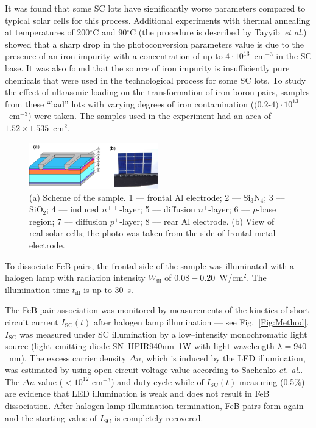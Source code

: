 \documentclass[%
 aip,jap,
 amsmath,amssymb,
 reprint,%
]{revtex4-1}
\begin{document}
It was found that some SC lots have significantly worse parameters compared to typical solar cells for this process.
Additional experiments with thermal annealing at temperatures of 200$^\circ$C and 90$^\circ$C
(the procedure is described by Tayyib~\emph{et al.}\cite{TAYYIB201221})
showed that a sharp drop in the photoconversion parameters value is due to the presence of an iron impurity with a concentration of up to $4\cdot10^{13}$~cm$^{-3}$ in the SC base.
It was also found that the source of iron impurity is insufficiently pure chemicals that were used in the technological process for some SC lots.
To study the effect of ultrasonic loading on the transformation  of iron-boron pairs, samples from these ``bad'' lots with varying degrees of iron contamination ($(0.2$-$4)\cdot10^{13}$~cm$^{-3}$) were taken.
The samples used in the experiment had an area of $1.52\times1.535$~cm$^2$.

\begin{figure}
\includegraphics[width=0.5\textwidth]{Fig1}%
\caption{\label{Fig:sample}
(a) Scheme of the sample.
1 –-- frontal Al electrode;
2 –-- Si$_3$N$_4$;
3 –-- SiO$_2$;
4 –-- induced $n^{++}$-layer;
5 –-- diffusion $n^+$-layer;
6 –-- $p$-base region;
7 –-- diffusion $p^+$-layer;
8 –-- rear Al electrode.
(b) View of real solar cells;
the photo was taken from the side of frontal metal electrode.
}
\end{figure}

To dissociate FeB pairs, the frontal side of the sample was illuminated with a halogen lamp with radiation intensity $W_\mathrm{ill}$ of $0.08-0.20$~W/cm$^2$.
The illumination time $t_\mathrm{ill}$ is up to 30~s.

The FeB pair association was monitored by measurements of the kinetics of
short circuit current $I_\mathrm{SC}(t)$ after halogen lamp illumination –-- see Fig.~\ref{Fig:Method}.
$I_\mathrm{SC}$ was measured under SC illumination by a low--intensity monochromatic light source (light--emitting diode SN--HPIR940nm--1W with light wavelength $\lambda=940$~nm).
The excess carrier density $\Delta n$, which is induced by the LED illumination,
was estimated by using open-circuit voltage value according to Sachenko \emph{et. al.}\cite{JAPSach}.
The $\Delta n$ value ($<10^{12}$ cm$^{-3}$) and duty cycle while of $I_\mathrm{SC}(t)$ measuring (0.5\%)
are evidence that LED illumination is weak and does not result in FeB dissociation.
After halogen lamp illumination termination,
FeB pairs form again and the starting value of $I_\mathrm{SC}$ is completely recovered.
\end{document}
